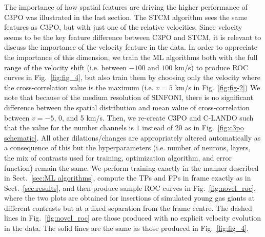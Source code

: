 \documentclass{aa}
\newcommand{\newchange}[1]{\textcolor{black}{#1}}
\begin{document}
The importance of how spatial features are driving the higher performance of C3PO was illustrated in the last section. The STCM algorithm sees the same features as C3PO, but with just one of the relative velocities.
Since velocity seems to be the key feature difference between C3PO and STCM, it is relevant to discuss the importance of the velocity feature in the data. 
In order to appreciate the importance of this dimension, we train the ML algorithms both with the full range of the velocity shift (i.e. between $-100$ and $100$ km/s) to produce ROC curves in Fig.~\ref{fig:fig_4}, but also train them by choosing only the velocity where the cross-correlation value is the maximum (i.e. $v=5$ km/s in Fig.~\ref{fig:fig-2})
We note that because of the medium resolution of SINFONI, there is no significant difference between the spatial distribution and mean value of cross-correlation between $v=-5$, 0, and 5 km/s. 
Then, we re-create C3PO and C-LANDO such that the value for the number channels is $1$ instead of $20$ as in Fig.~\ref{fig:c3po schematic}.
All other dilations/changes are appropriately altered automatically as a consequence of this but the hyperparameters (i.e. number of neurons, layers, the mix of contrasts used for training, optimization algorithm, and error function) remain the same.
We perform training exactly in the manner described in Sect.~\ref{sec:ML algorithms}, compute the TPs and FPs in frame exactly as in Sect.~\ref{sec:results}, and then produce sample ROC curves in Fig.~\ref{fig:novel_roc}, where the two plots are obtained for insertions of simulated \newchange{young gas giant}s at different contrasts but at a fixed separation from the frame centre.
The dashed lines in Fig.~\ref{fig:novel_roc} are those produced with no explicit velocity evolution in the data.
The solid lines are the same as those produced in Fig.~\ref{fig:fig_4}.
\end{document}
